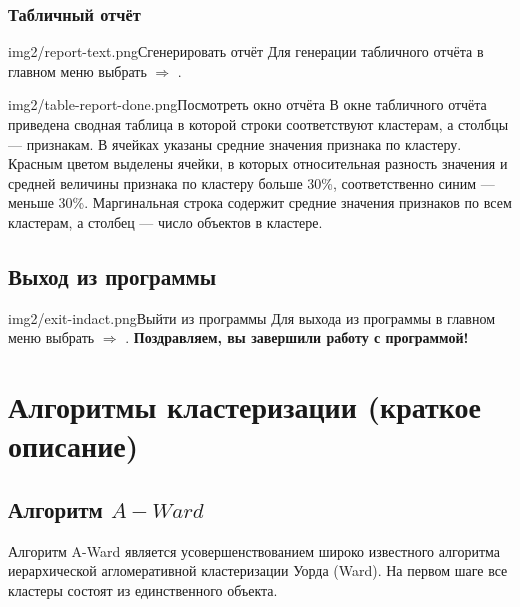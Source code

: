 \documentclass[12pt,tikz]{instruction}
\begin{document}
\newpage
\subsubsection{Табличный отчёт}

\begin{steps}
	\begin{ist}{img2/report-text.png}{Сгенерировать отчёт}
		Для генерации табличного отчёта в главном меню выбрать  $\Rightarrow$ .
	\end{ist}
	\begin{ist}{img2/table-report-done.png}{Посмотреть окно отчёта}
		В окне табличного отчёта приведена сводная таблица в которой строки соответствуют кластерам, а столбцы --- признакам. В ячейках указаны средние значения признака по кластеру. Красным цветом выделены ячейки, в которых относительная разность значения и средней величины признака по кластеру больше 30\%, соответственно синим --- меньше 30\%. Маргинальная строка содержит средние значения признаков по всем кластерам, а столбец --- число объектов в кластере.
	\end{ist}
	
\end{steps}


\newpage
\subsection{Выход из программы}

\begin{steps}
	\begin{ist}{img2/exit-indact.png}{Выйти из программы}
			Для выхода из программы в главном меню выбрать  $\Rightarrow$ . \textbf{Поздравляем, вы завершили работу с программой!}
	\end{ist}
\end{steps}

\section{Алгоритмы кластеризации (краткое описание)}
\label{sec:algs}
\subsection{Алгоритм $ A-Ward $}
\label{subsec:a-ward}
Алгоритм A-Ward является усовершенствованием  широко известного алгоритма иерархической агломеративной кластеризации Уорда (Ward)\cite{ward}. На первом шаге все кластеры состоят из единственного объекта. 
\end{document}
